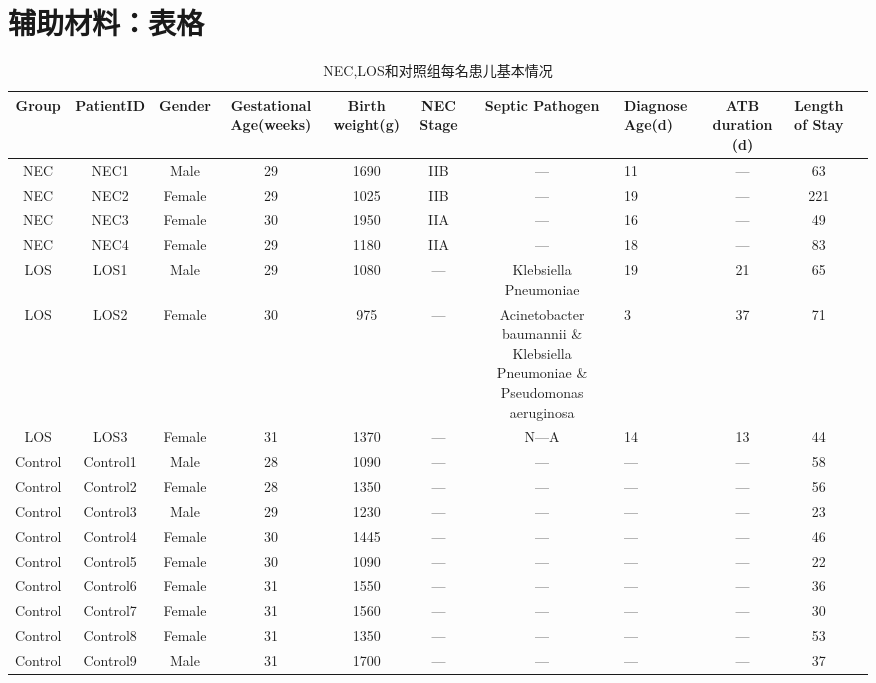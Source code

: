 \chapter{辅助材料：表格}
\label{app:table}
\begin{sidewaystable}[h]
  \tiny
\caption{NEC,LOS和对照组每名患儿基本情况} %
\centering %
\begin{tabular}{cccccccp{2cm}ccc} %
\hline\hline %
Group & PatientID & Gender& Gestational Age(weeks) & Birth weight(g) & NEC Stage & Septic Pathogen & Diagnose Age(d) & ATB duration (d) & Length of Stay \\ [0.05ex]
\hline %
NEC & NEC1 & Male & 29 & 1690 & IIB & — & 11 & — & 63 \\
NEC & NEC2 & Female & 29 & 1025 & IIB & — & 19 & — & 221 \\
NEC & NEC3 & Female & 30 & 1950 & IIA & — & 16 & — & 49 \\
NEC & NEC4 & Female & 29 & 1180 & IIA & — & 18 & — & 83 \\
LOS & LOS1 & Male & 29 & 1080 & — & Klebsiella Pneumoniae & 19 & 21 & 65 \\
LOS & LOS2 & Female & 30 & 975 & — & Acinetobacter baumannii \&  Klebsiella Pneumoniae \&  Pseudomonas aeruginosa & 3 & 37 & 71 \\
LOS & LOS3 & Female & 31 & 1370 & — & N—A & 14 & 13 & 44 \\
Control & Control1 & Male & 28 & 1090 & — & — & — & — & 58 \\
Control & Control2 & Female & 28 & 1350 & — & — & — & — & 56 \\
Control & Control3 & Male & 29 & 1230 & — & — & — & — & 23 \\
Control & Control4 & Female & 30 & 1445 & — & — & — & — & 46 \\
Control & Control5 & Female & 30 & 1090 & — & — & — & — & 22  \\
Control & Control6 & Female & 31 & 1550 & — & — & — & — & 36 \\
Control & Control7 & Female & 31 & 1560 & — & — & — & — & 30 \\
Control & Control8 & Female & 31 & 1350 & — & — & — & — & 53 \\
Control & Control9 & Male & 31 & 1700 & — & — & — & — & 37 \\

\end{tabular}
\end{sidewaystable}

